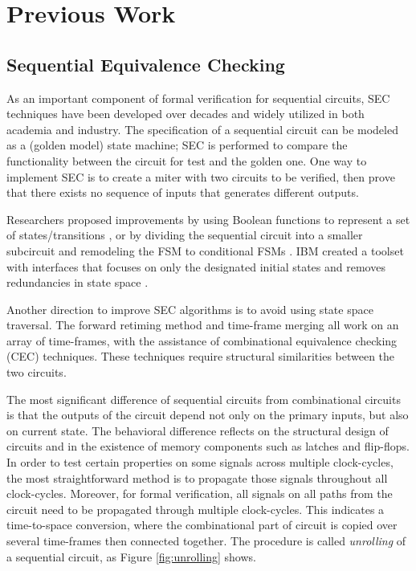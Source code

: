 \chapter{Previous Work}
\label{ch:prev}
\vspace{-0.8cm}
\section{Sequential Equivalence Checking}
As an important component of formal verification for sequential circuits, SEC techniques 
have been developed over decades and widely utilized in both academia and industry. 
The specification of a sequential circuit can be modeled as a (golden model) state machine;
SEC is performed to compare the functionality between the circuit for test and the golden one.
One way to implement SEC is to create a miter with two circuits to be verified, then 
prove that there exists no sequence of inputs that generates different outputs.

Researchers proposed improvements by using Boolean functions to represent 
a set of states/transitions \cite{coudert2003unified, coudert1990verification},  or by dividing the sequential circuit
into a smaller subcircuit and remodeling the FSM to conditional FSMs \cite{khasidashvili2004theoretical}. IBM created a toolset with 
interfaces that focuses on only the designated initial states and removes redundancies in state space \cite{baumgartner2007scalable}.

Another direction to improve SEC algorithms is to avoid using state space traversal. 
The forward retiming method \cite{van1998sequential} and time-frame merging \cite{stoffel1997record} 
all work on an array of time-frames,  with the assistance of combinational equivalence checking (CEC)
techniques. These techniques require structural similarities between the two circuits.

The most significant difference of sequential circuits from combinational circuits is 
that the outputs of the circuit depend not only 
on the primary inputs, but also on current state. 
The behavioral difference reflects on the structural design of circuits and in 
the existence of memory components such as latches and flip-flops.
In order to test certain properties on some signals across multiple clock-cycles,
the most straightforward method is to propagate those signals throughout 
all clock-cycles. Moreover, for formal verification, all signals on all paths from the circuit
need to be propagated through multiple clock-cycles.
This indicates a time-to-space conversion, where 
 the combinational part of circuit
is copied over several time-frames then connected together.
The procedure is called {\it unrolling} of a sequential circuit, as 
Figure \ref{fig:unrolling} shows.

